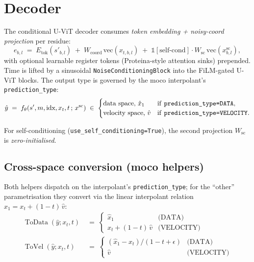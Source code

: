 \documentclass[11pt]{article}
\begin{document}
\section{Decoder}

The conditional U-ViT decoder consumes \emph{token embedding + noisy-coord projection} per residue:
\begin{equation}
e_{b,l} \;=\; E_{\text{tok}}(s'_{b,l}) \;+\; W_{\text{coord}} \, \mathrm{vec}(x_{t,b,l}) \;+\; \mathbb{1}\!\left[\text{self-cond}\right] \cdot W_{\text{sc}} \, \mathrm{vec}\!\left(x^{\text{sc}}_{b,l}\right),
\end{equation}
with optional learnable register tokens (Proteina-style attention sinks) prepended. Time is lifted by a sinusoidal \texttt{NoiseConditioningBlock} into the FiLM-gated U-ViT blocks. The output type is governed by the moco interpolant's \texttt{prediction\_type}:
\begin{equation}
\hat{y} \;=\; f_\theta(s', m, \text{idx}, x_t, t \,;\, x^{\text{sc}}) \;\in\;
\begin{cases}
\text{data space, } \hat{x}_1 & \text{if \texttt{prediction\_type=DATA},}\\
\text{velocity space, } \hat{v} & \text{if \texttt{prediction\_type=VELOCITY}.}
\end{cases}
\end{equation}

For self-conditioning (\texttt{use\_self\_conditioning=True}), the second projection $W_{\text{sc}}$ is \emph{zero-initialised}.

\subsection{Cross-space conversion (moco helpers)}

Both helpers dispatch on the interpolant's \texttt{prediction\_type}; for the ``other'' parametrisation they convert via the linear interpolant relation $\hat{x}_1 = x_t + (1-t)\,\hat{v}$:
\begin{align}
\operatorname{ToData}(\hat{y}; x_t, t) &\;=\; \begin{cases} \hat{x}_1 & \text{(DATA)} \\ x_t + (1-t)\,\hat{v} & \text{(VELOCITY)} \end{cases} \\[0.4em]
\operatorname{ToVel}(\hat{y}; x_t, t) &\;=\; \begin{cases} (\hat{x}_1 - x_t)/(1 - t + \epsilon) & \text{(DATA)} \\ \hat{v} & \text{(VELOCITY)} \end{cases}
\end{align}
\end{document}
